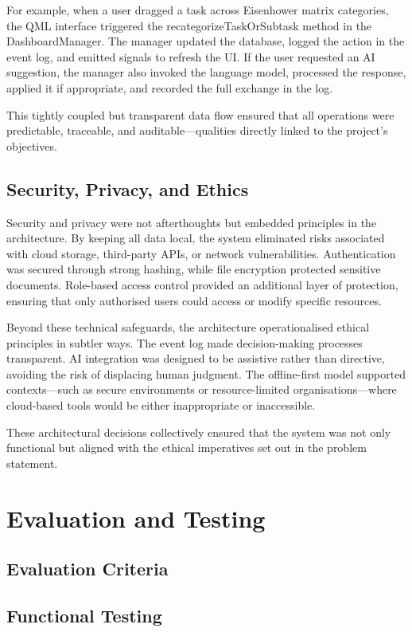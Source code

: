\documentclass{report}
\begin{document}
For example, when a user dragged a task across Eisenhower matrix categories, the QML interface triggered the recategorizeTaskOrSubtask method in the DashboardManager. The manager updated the database, logged the action in the event log, and emitted signals to refresh the UI. If the user requested an AI suggestion, the manager also invoked the language model, processed the response, applied it if appropriate, and recorded the full exchange in the log.

This tightly coupled but transparent data flow ensured that all operations were predictable, traceable, and auditable—qualities directly linked to the project’s objectives.

\section{Security, Privacy, and Ethics}

Security and privacy were not afterthoughts but embedded principles in the architecture. By keeping all data local, the system eliminated risks associated with cloud storage, third-party APIs, or network vulnerabilities. Authentication was secured through strong hashing, while file encryption protected sensitive documents. Role-based access control provided an additional layer of protection, ensuring that only authorised users could access or modify specific resources.

Beyond these technical safeguards, the architecture operationalised ethical principles in subtler ways. The event log made decision-making processes transparent. AI integration was designed to be assistive rather than directive, avoiding the risk of displacing human judgment. The offline-first model supported contexts—such as secure environments or resource-limited organisations—where cloud-based tools would be either inappropriate or inaccessible.

These architectural decisions collectively ensured that the system was not only functional but aligned with the ethical imperatives set out in the problem statement.


\chapter{Evaluation and Testing}  %
\section{Evaluation Criteria}
\section{Functional Testing}
\end{document}
